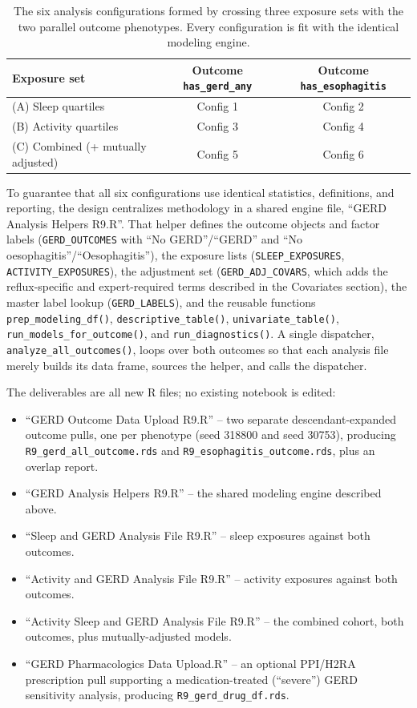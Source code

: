 \documentclass[11pt]{article}
\newcommand{\code}[1]{\texttt{\small #1}}
\begin{document}
\begin{table}[h]
\centering
\begin{tabular}{lcc}
\toprule
Exposure set & Outcome \code{has_gerd_any} & Outcome \code{has_esophagitis} \\
\midrule
(A) Sleep quartiles & Config 1 & Config 2 \\
(B) Activity quartiles & Config 3 & Config 4 \\
(C) Combined (+ mutually adjusted) & Config 5 & Config 6 \\
\bottomrule
\end{tabular}
\caption{The six analysis configurations formed by crossing three exposure sets with the two parallel outcome phenotypes. Every configuration is fit with the identical modeling engine.}
\end{table}

To guarantee that all six configurations use identical statistics, definitions, and reporting, the design centralizes methodology in a shared engine file, ``GERD Analysis Helpers R9.R''. That helper defines the outcome objects and factor labels (\code{GERD_OUTCOMES} with ``No GERD''/``GERD'' and ``No oesophagitis''/``Oesophagitis''), the exposure lists (\code{SLEEP_EXPOSURES}, \code{ACTIVITY_EXPOSURES}), the adjustment set (\code{GERD_ADJ_COVARS}, which adds the reflux-specific and expert-required terms described in the Covariates section), the master label lookup (\code{GERD_LABELS}), and the reusable functions \code{prep_modeling_df()}, \code{descriptive_table()}, \code{univariate_table()}, \code{run_models_for_outcome()}, and \code{run_diagnostics()}. A single dispatcher, \code{analyze_all_outcomes()}, loops over both outcomes so that each analysis file merely builds its data frame, sources the helper, and calls the dispatcher.

The deliverables are all new R files; no existing notebook is edited:

\begin{itemize}
  \item ``GERD Outcome Data Upload R9.R'' -- two separate descendant-expanded outcome pulls, one per
  phenotype (seed 318800 and seed 30753), producing \code{R9_gerd_all_outcome.rds} and
  \code{R9_esophagitis_outcome.rds}, plus an overlap report.
  \item ``GERD Analysis Helpers R9.R'' -- the shared modeling engine described above.
  \item ``Sleep and GERD Analysis File R9.R'' -- sleep exposures against both outcomes.
  \item ``Activity and GERD Analysis File R9.R'' -- activity exposures against both outcomes.
  \item ``Activity Sleep and GERD Analysis File R9.R'' -- the combined cohort, both outcomes, plus mutually-adjusted models.
  \item ``GERD Pharmacologics Data Upload.R'' -- an optional PPI/H2RA prescription pull supporting a medication-treated (``severe'') GERD sensitivity analysis, producing \code{R9_gerd_drug_df.rds}.
\end{itemize}
\end{document}
